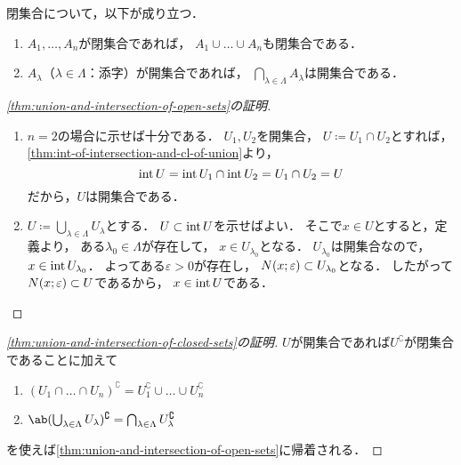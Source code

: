 \documentclass[../sotsu.tex]{subfiles}
\begin{document}
\begin{corollary}
    \label{thm:union-and-intersection-of-closed-sets}
    閉集合について，以下が成り立つ．
    \begin{enumerate}
    \item $A_1, \dots, A_n$が閉集合であれば，
        $A_1 \cup \dots \cup A_n$も閉集合である．
    \item $A_\lambda$（$\lambda \in \Lambda$：添字）が開集合であれば，
        $\bigcap_{\lambda \in \Lambda} A_\lambda$は開集合である．
    \end{enumerate}
\end{corollary}


\begin{proof}[\cref{thm:union-and-intersection-of-open-sets}の証明]
    \begin{enumerate}
        \item $n = 2$の場合に示せば十分である．
            $U_1, U_2$を開集合，
            $U \coloneq U_1 \cap U_2$とすれば，
            \cref{thm:int-of-intersection-and-cl-of-union}より，
            \begin{equation*}
                \operatorname{int}{U} = \operatorname{int}{U_1} \cap \operatorname{int}{U_2}
                    = U_1 \cap U_2
                    = U
            \end{equation*}
            だから，$U$は開集合である．
        \item $U \coloneq \bigcup_{\lambda \in \Lambda} U_\lambda$とする．
            $U \subset \operatorname{int}{U}$を示せばよい．
            そこで$x \in U$とすると，定義より，
            ある$\lambda_0 \in \Lambda$が存在して，
            $x \in U_{\lambda_0}$となる．
            $U_{\lambda_0}$は開集合なので，$x \in \operatorname{int}{U_{\lambda_0}}$．
            よってある$\varepsilon > 0$が存在し，
            $N(x; \varepsilon) \subset U_{\lambda_0}$となる．
            したがって$N(x; \varepsilon) \subset U$であるから，
            $x \in \operatorname{int}{U}$である．
            \qedhere
    \end{enumerate}
\end{proof}


\begin{proof}[\cref{thm:union-and-intersection-of-closed-sets}の証明]
    $U$が開集合であれば$U^\complement$が閉集合であることに加えて
    \begin{enumerate}
        \item $(U_1 \cap \dots \cap U_n)^\complement = U_1^\complement \cup \dots \cup U_n^\complement$
        \item $\ab( \bigcup_{\lambda \in \Lambda} U_\lambda )^\complement = \bigcap_{\lambda \in \Lambda} U_\lambda^\complement $
    \end{enumerate}
    を使えば\cref{thm:union-and-intersection-of-open-sets}に帰着される．
\end{proof}
\end{document}
